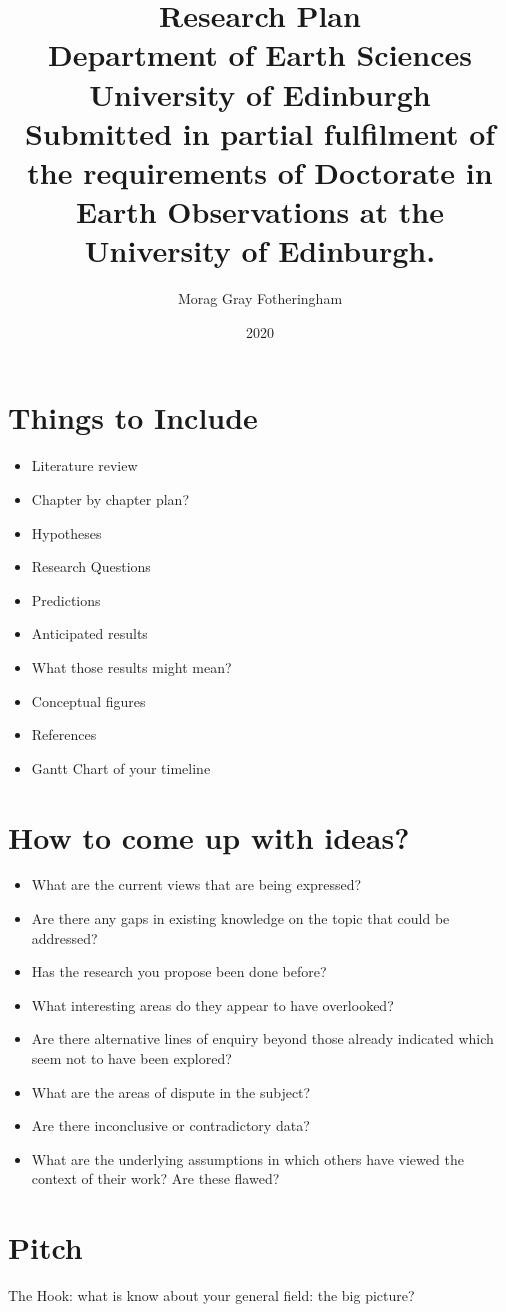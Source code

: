 \documentclass[12pt,twoside]{report}
\title{
{Research Plan}\\
{\large Department of Earth Sciences }\\
{\large University of Edinburgh}\\
{\small Submitted in partial fulfilment of the requirements of Doctorate in Earth Observations at the University of Edinburgh.}\\
}
\author{Morag Gray Fotheringham}
\date{2020}
\newcommand{\mychapter}[2]{
    \setcounter{chapter}{#1}
    \setcounter{section}{0}
    \chapter*{#2}
    \addcontentsline{toc}{chapter}{#2}
}
\begin{document}
\onehalfspacing
\maketitle 

\chapter*{Things to Include}
\begin{itemize}
\item Literature review
\item Chapter by chapter plan?
\item Hypotheses
\item Research Questions
\item Predictions
\item Anticipated results
\item What those results might mean?
\item Conceptual figures
\item References
\item Gantt Chart of your timeline
\end{itemize}
 
\chapter*{How to come up with ideas?}
\begin{itemize}
\item What are the current views that are being expressed?
\item Are there any gaps in existing knowledge on the topic that could be addressed?
\item Has the research you propose been done before?
\item What interesting areas do they appear to have overlooked?
\item Are there alternative lines of enquiry beyond those already indicated which seem not to have been
explored?
\item What are the areas of dispute in the subject?
\item Are there inconclusive or contradictory data?
\item What are the underlying assumptions in which others have viewed the context of their work? Are
these flawed?
\end{itemize}

\tableofcontents

\mychapter{1}{Pitch}
The Hook: what is know about your general field: the big picture?
\end{document}
